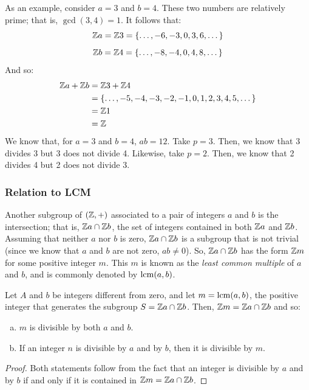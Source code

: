 \documentclass[letterpaper]{article}
\begin{document}
As an example, consider $a = 3$ and $b = 4$. These two numbers are relatively prime; that is, $\gcd(3, 4) = 1$. It follows that: 
\[\mathbb{Z} a = \mathbb{Z} 3 = \{\dots, -6, -3, 0, 3, 6, \dots\}\]
\[\mathbb{Z} b = \mathbb{Z} 4 = \{\dots, -8, -4, 0, 4, 8, \dots\}\]
And so: 
\begin{equation*}
    \begin{aligned}
        \mathbb{Z} a + \mathbb{Z} b &= \mathbb{Z} 3 + \mathbb{Z} 4 \\ 
            &= \{\dots, -5, -4, -3, -2, -1, 0, 1, 2, 3, 4, 5, \dots\} \\ 
            &= \mathbb{Z} 1 \\ 
            &= \mathbb{Z}
    \end{aligned}
\end{equation*}
We know that, for $a = 3$ and $b = 4$, $ab = 12$. Take $p = 3$. Then, we know that 3 divides 3 but 3 does not divide 4. Likewise, take $p = 2$. Then, we know that 2 divides 4 but 2 does not divide 3. 

\subsubsection{Relation to LCM}
Another subgroup of $(\mathbb{Z}, +)$ associated to a pair of integers $a$ and $b$ is the intersection; that is, $\mathbb{Z} a \cap \mathbb{Z} b$, the set of integers contained in both $\mathbb{Z} a$ and $\mathbb{Z} b$. Assuming that neither $a$ nor $b$ is zero, $\mathbb{Z} a \cap \mathbb{Z} b$ is a subgroup that is not trivial (since we know that $a$ and $b$ are not zero, $ab \neq 0$). So, $\mathbb{Z} a \cap \mathbb{Z} b$ has the form $\mathbb{Z} m$ for some positive integer $m$. This $m$ is known as the \emph{least common multiple} of $a$ and $b$, and is commonly denoted by $\operatorname{lcm}(a, b)$. 

\begin{mdframed}
    \begin{proposition}
        Let $A$ and $b$ be integers different from zero, and let $m = \operatorname{lcm}(a, b)$, the positive integer that generates the subgroup $S = \mathbb{Z} a \cap \mathbb{Z} b$. Then, $\mathbb{Z} m = \mathbb{Z} a \cap \mathbb{Z} b$ and so: 
        \begin{enumerate}[(a)]
            \item $m$ is divisible by both $a$ and $b$. 
            \item If an integer $n$ is divisible by $a$ and by $b$, then it is divisible by $m$. 
        \end{enumerate}
    \end{proposition}
\end{mdframed}

\begin{mdframed}
    \begin{proof}
        Both statements follow from the fact that an integer is divisible by $a$ and by $b$ if and only if it is contained in $\mathbb{Z} m = \mathbb{Z} a \cap \mathbb{Z} b$. 
    \end{proof}
\end{mdframed}
\end{document}
